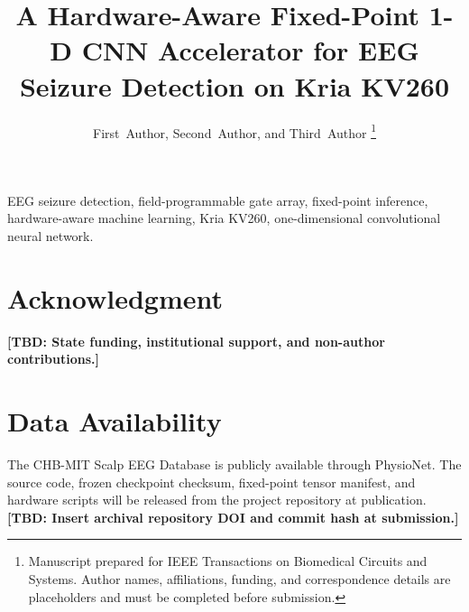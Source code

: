 \documentclass[journal]{IEEEtran}
\title{A Hardware-Aware Fixed-Point 1-D CNN Accelerator for EEG Seizure Detection on Kria KV260}
\author{First~Author, Second~Author, and Third~Author%
\thanks{Manuscript prepared for IEEE Transactions on Biomedical Circuits and Systems. Author names, affiliations, funding, and correspondence details are placeholders and must be completed before submission.}%
}
\newcommand{\tbd}[1]{\textbf{[TBD: #1]}}
\begin{document}
\maketitle

\begin{abstract}

\end{abstract}

\begin{IEEEkeywords}
EEG seizure detection, field-programmable gate array, fixed-point inference,
hardware-aware machine learning, Kria KV260, one-dimensional convolutional
neural network.
\end{IEEEkeywords}









\section*{Acknowledgment}
\tbd{State funding, institutional support, and non-author contributions.}

\section*{Data Availability}
The CHB-MIT Scalp EEG Database is publicly available through PhysioNet. The
source code, frozen checkpoint checksum, fixed-point tensor manifest, and
hardware scripts will be released from the project repository at publication.
\tbd{Insert archival repository DOI and commit hash at submission.}



\end{document}
